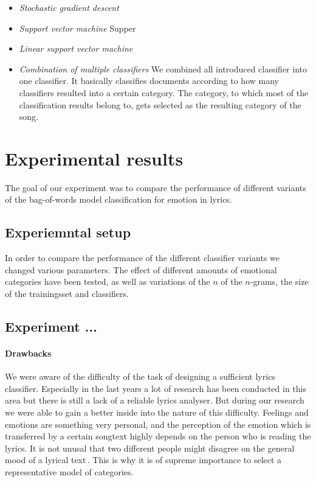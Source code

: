 \documentclass[a4paper,12pt]{article}
\begin{document}
\begin{itemize}
\item \textit{Stochastic gradient descent}

\item \textit{Support vector machine}
Supper 
\item \textit{Linear support vector machine}
\item \textit{Combination of multiple classifiers} We combined all introduced classifier into one classifier. It basically classifies documents according to how many classifiers resulted into a certain category. The category, to which most of the classification results belong to, gets selected as the resulting category of the song.
\end{itemize}

\section{Experimental results}
\label{sec:exps}
The goal of our experiment was to compare the performance of different variants of the bag-of-words model classification for emotion in lyrics. 
 

\subsection{Experiemntal setup}
In order to compare the performance of the different classifier variants we changed various parameters. The effect of different amounts of emotional categories have been tested, as well as variations of the $n$ of the $n$-grams, the size of the trainingsset and classifiers.


\subsection{Experiment ...}

\paragraph{Drawbacks} We were aware of the difficulty of the task of designing a sufficient lyrics classifier. Especially in the last years a lot of research has been conducted in this area but there is still a lack of a reliable lyrics analyser. But during our research we were able to gain a better inside into the nature of this difficulty. Feelings and emotions are something very personal, and the perception of the emotion which is transferred by a certain songtext highly depends on the person who is reading the lyrics. It is not unusal that two different people might disagree on the general mood of a lyrical text\,\cite{wilson2005recognizing}. This is why it is of supreme importance to select a representative model of categories.
\end{document}
